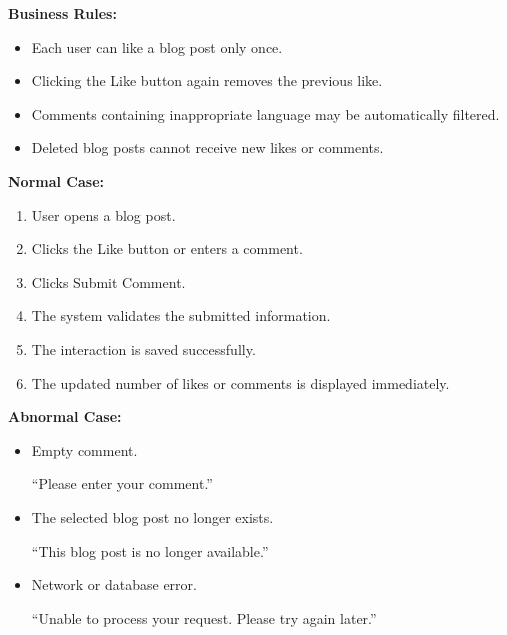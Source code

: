 \vspace{0.2cm}

\textbf{Business Rules:}

\begin{itemize}
    \item Each user can like a blog post only once.
    \item Clicking the Like button again removes the previous like.
    \item Comments containing inappropriate language may be automatically filtered.
    \item Deleted blog posts cannot receive new likes or comments.
\end{itemize}

\vspace{0.2cm}

\textbf{Normal Case:}

\begin{enumerate}
    \item User opens a blog post.
    \item Clicks the Like button or enters a comment.
    \item Clicks Submit Comment.
    \item The system validates the submitted information.
    \item The interaction is saved successfully.
    \item The updated number of likes or comments is displayed immediately.
\end{enumerate}

\vspace{0.2cm}

\textbf{Abnormal Case:}

\begin{itemize}
    \item Empty comment.

    ``Please enter your comment.''

    \item The selected blog post no longer exists.

    ``This blog post is no longer available.''

    \item Network or database error.

    ``Unable to process your request. Please try again later.''
\end{itemize}



